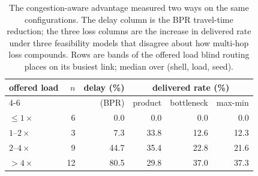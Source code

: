 \begin{table}[t]
\centering\scriptsize\setlength{\tabcolsep}{3.4pt}
\caption{The congestion-aware advantage measured two ways on the same configurations. The delay column is the BPR travel-time reduction; the three loss columns are the increase in delivered rate under three feasibility models that disagree about how multi-hop loss compounds. Rows are bands of the offered load blind routing places on its busiest link; median over (shell, load, seed).}
\label{tab:feasibility}
\begin{tabular}{@{}lrrrrr@{}}
\toprule
offered load & $n$ & delay (\%) & \multicolumn{3}{c}{delivered rate (\%)} \\
\cmidrule(l){4-6}
 & & (BPR) & product & bottleneck & max-min \\
\midrule
$\le 1\times$ & 6 & 0.0 & 0.0 & 0.0 & 0.0 \\
$1$--$2\times$ & 3 & 7.3 & 33.8 & 12.6 & 12.3 \\
$2$--$4\times$ & 9 & 44.7 & 35.4 & 22.8 & 21.6 \\
$>4\times$ & 12 & 80.5 & 29.8 & 37.0 & 37.3 \\
\bottomrule
\end{tabular}
\end{table}
